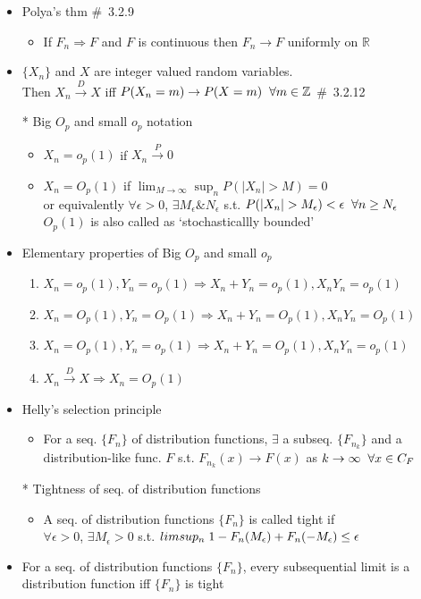 \documentclass[12pt, A4]{article}
\begin{document}
\begin{itemize}
	\item Polya's thm \quad \#\ 3.2.9
	\begin{itemize}
		\item If $F_n\Rightarrow F$ and $F$ is continuous then $F_n\rightarrow F$ uniformly on $\mathbb{R}$
	\end{itemize}
	\item $\{X_n\}$ and $X$ are integer valued random variables. \\ Then $X_n\xrightarrow{D}X$ iff $P(X_n=m)\rightarrow P(X=m) \hspace{0.2cm} \forall m\in\mathbb{Z}$ \quad \#\ 3.2.12
	\item[*] Big $O_p$ and small $o_p$ notation
	\begin{itemize}
		\item $X_n=o_p(1)$ if $X_n\xrightarrow{P} 0$
		\item $X_n=O_p(1)$ if $\lim_{M \to \infty}\sup_{n}P(|X_n|>M)=0$
		\\ or equivalently $\forall \epsilon>0$, $\exists M_\epsilon \& N_\epsilon$ s.t. $P(|X_n|>M_\epsilon)<\epsilon \hspace{0.2cm} \forall n\geq N_\epsilon$
		\\$O_p(1)$ is also called as `stochasticallly bounded'
	\end{itemize}
	\item Elementary properties of Big $O_p$ and small $o_p$
	\begin{enumerate}
		\item $X_n=o_p(1), Y_n=o_p(1) \Rightarrow X_n+Y_n=o_p(1), X_nY_n=o_p(1)$
		\item $X_n=O_p(1), Y_n=O_p(1) \Rightarrow X_n+Y_n=O_p(1), X_nY_n=O_p(1)$
		\item $X_n=O_p(1), Y_n=o_p(1) \Rightarrow X_n+Y_n=O_p(1), X_nY_n=o_p(1)$
		\item $X_n\xrightarrow{D} X \Rightarrow X_n=O_p(1)$
	\end{enumerate}
\clearpage
	\item Helly's selection principle
	\begin{itemize}
		\item For a seq. $\{F_n\}$ of distribution functions, $\exists$ a subseq. $\{F_{n_k}\}$ and a distribution-like func. $F$ s.t. $F_{n_k}(x)\rightarrow F(x)$ as $k\rightarrow \infty \hspace{0.2cm} \forall x \in C_F$
	\end{itemize}
	\item[*] Tightness of seq. of distribution functions
	\begin{itemize}
		\item A seq. of distribution functions $\{F_n\}$ is called tight if \\ $\forall \epsilon>0$, $\exists M_\epsilon>0$ s.t. $limsup_n \hspace{0.1cm}1-F_n(M_\epsilon)+F_n(-M_\epsilon)\leq \epsilon$
	\end{itemize}
	\item For a seq. of distribution functions $\{F_n\}$, every subsequential limit is a distribution function iff $\{F_n\}$ is tight
\end{itemize}
\bigskip
\end{document}
